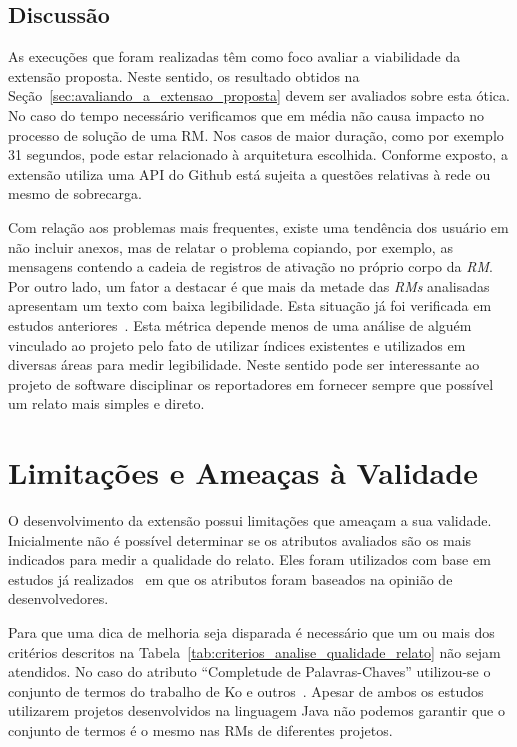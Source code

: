 \subsection{Discussão}
\label{sub:implemtacao_extensao_avaliacao_discussao}

As execuções que foram realizadas têm como foco avaliar a viabilidade da
extensão proposta. Neste sentido, os resultado obtidos na
Seção~\ref{sec:avaliando_a_extensao_proposta} devem ser avaliados sobre esta
ótica. No caso do tempo necessário verificamos que em média não causa impacto no
processo de solução de uma RM\@. Nos casos de maior duração, como por exemplo
31 segundos, pode estar relacionado à arquitetura escolhida. Conforme exposto,
a extensão utiliza uma API do Github está sujeita a questões relativas à rede
ou mesmo de sobrecarga.

Com relação aos problemas mais frequentes, existe uma tendência dos usuário em
não incluir anexos, mas de relatar o problema copiando, por exemplo, as
mensagens contendo a cadeia de registros de ativação no próprio corpo da
\textit{RM}. Por outro lado, um fator a destacar é que mais da metade das
\textit{RMs} analisadas apresentam um texto com baixa legibilidade. Esta
situação já foi verificada em estudos anteriores~\cite{ko2006linguistic,
    bettenburg2007quality}. Esta métrica depende menos de uma análise de alguém
vinculado ao projeto pelo fato de utilizar índices existentes e utilizados em
diversas áreas para medir legibilidade. Neste sentido pode ser interessante ao
projeto de software disciplinar os reportadores em fornecer sempre que possível
um relato mais simples e direto.

\section{Limitações e Ameaças à Validade}
\label{sec:limitações_e_ameças_à_validade}

O desenvolvimento da extensão possui limitações que ameaçam a sua validade.
Inicialmente não é possível determinar se os atributos avaliados são os mais
indicados para medir a qualidade do relato. Eles foram utilizados com base em
estudos já realizados~\cite{bettenburg2007quality} em que os atributos foram
baseados na opinião de desenvolvedores.

Para que uma dica de melhoria seja disparada é necessário que um ou mais dos
critérios descritos na Tabela~\ref{tab:criterios_analise_qualidade_relato} não
sejam atendidos. No caso do atributo ``Completude de Palavras-Chaves''
utilizou-se o conjunto de termos do trabalho de Ko e
outros~\cite{ko2006linguistic}. Apesar de ambos os estudos utilizarem projetos
desenvolvidos na linguagem Java não podemos garantir que o conjunto de termos é
o mesmo nas RMs de diferentes projetos.

